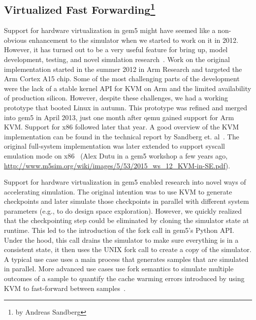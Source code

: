 \subsection[Virtualized Fast Forwarding]{Virtualized Fast Forwarding\footnote{by Andreas Sandberg}}

Support for hardware virtualization in gem5 might have seemed like a non-obvious enhancement to the simulator when we started to work on it in 2012.
However, it has turned out to be a very useful feature for bring up, model development, testing, and novel simulation research~\cite{full-speed-ahead, NikolerisSHC16, NikolerisEHC19}.
Work on the original implementation started in the summer 2012 in Arm Research and targeted the Arm Cortex A15 chip. Some of the most challenging parts of the development were the lack of a stable kernel API for KVM on Arm and the limited availability of production silicon.
However, despite these challenges, we had a working prototype that booted Linux in autumn.
This prototype was refined and merged into gem5 in April 2013, just one month after qemu gained support for Arm KVM.
Support for x86 followed later that year.
A good overview of the KVM implementation can be found in the technical report by Sandberg et. al~\cite{full-speed-ahead}.
The original full-system implementation was later extended to support syscall emulation mode on x86~\cite{} (Alex Dutu in a gem5 workshop a few years ago, \url{http://www.m5sim.org/wiki/images/5/53/2015_ws_12_KVM-in-SE.pdf}).

Support for hardware virtualization in gem5 enabled research into novel ways of accelerating simulation.
The original intention was to use KVM to generate checkpoints and later simulate those checkpoints in parallel with different system parameters (e.g., to do design space exploration).
However, we quickly realized that the checkpointing step could be eliminated by cloning the simulator state at runtime.
This led to the introduction of the fork call in gem5's Python API.
Under the hood, this call drains the simulator to make sure everything is in a consistent state, it then uses the UNIX fork call to create a copy of the simulator.
A typical use case uses a main process that generates samples that are simulated in parallel.
More advanced use cases use fork semantics to simulate multiple outcomes of a sample to quantify the cache warming errors introduced by using KVM to fast-forward between samples~\cite{full-speed-ahead}.
